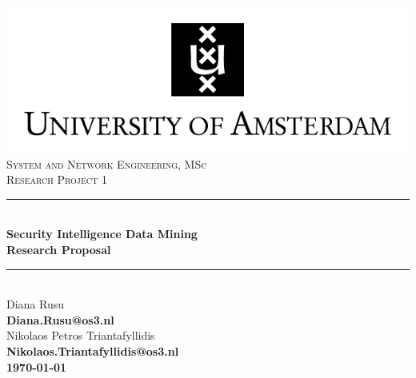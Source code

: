 \documentclass[12pt]{article}
\begin{document}
\begin{titlepage}

\newcommand{\HRule}{\rule{\linewidth}{0.5mm}} 
\center


\includegraphics{images/uva.jpeg}\\[0.5cm]%
 

\textsc{\Large System and Network Engineering, MSc}\\[0.5cm] 
\textsc { \large Research Project 1}\\[0.4cm] %

\HRule \\[0.4cm]
{ \huge \bfseries Security Intelligence Data Mining}\\[0.4cm] %
{ \large \bfseries Research Proposal}\\[0.4cm] %
\HRule \\[0.4cm]






\large Diana Rusu\\
{\bfseries Diana.Rusu@os3.nl}\\[0.5cm]
\large Nikolaos Petros Triantafyllidis\\
\bfseries Nikolaos.Triantafyllidis@os3.nl\\[2cm]

{\large \today} 

\end{titlepage}
\end{document}
